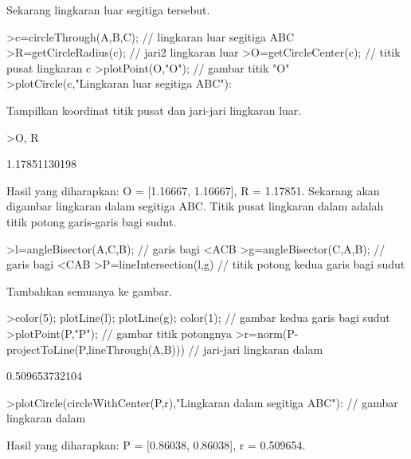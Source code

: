 \documentclass[a4paper,10pt]{article}
\begin{document}
\begin{eulernotebook}
\begin{eulercomment}
\begin{eulercomment}
\begin{eulercomment}
\begin{eulercomment}
\begin{eulercomment}
Sekarang lingkaran luar segitiga tersebut.
\end{eulercomment}
\begin{eulerprompt}
>c=circleThrough(A,B,C); // lingkaran luar segitiga ABC
>R=getCircleRadius(c); // jari2 lingkaran luar
>O=getCircleCenter(c); // titik pusat lingkaran c
>plotPoint(O,"O"); // gambar titik "O"
>plotCircle(c,"Lingkaran luar segitiga ABC"):
\end{eulerprompt}
\begin{eulercomment}
Tampilkan koordinat titik pusat dan jari-jari lingkaran luar.
\end{eulercomment}
\begin{eulerprompt}
>O, R
\end{eulerprompt}
\begin{euleroutput}
  [1.16667,  1.16667]
  1.17851130198
\end{euleroutput}
\begin{eulercomment}
Hasil yang diharapkan: O = [1.16667, 1.16667], R = 1.17851.
Sekarang akan digambar lingkaran dalam segitiga ABC. Titik pusat lingkaran dalam adalah
titik potong garis-garis bagi sudut.
\end{eulercomment}
\begin{eulerprompt}
>l=angleBisector(A,C,B); // garis bagi <ACB
>g=angleBisector(C,A,B); // garis bagi <CAB
>P=lineIntersection(l,g) // titik potong kedua garis bagi sudut
\end{eulerprompt}
\begin{euleroutput}
  [0.86038,  0.86038]
\end{euleroutput}
\begin{eulercomment}
Tambahkan semuanya ke gambar.
\end{eulercomment}
\begin{eulerprompt}
>color(5); plotLine(l); plotLine(g); color(1); // gambar kedua garis bagi sudut
>plotPoint(P,"P"); // gambar titik potongnya
>r=norm(P-projectToLine(P,lineThrough(A,B))) // jari-jari lingkaran dalam
\end{eulerprompt}
\begin{euleroutput}
  0.509653732104
\end{euleroutput}
\begin{eulerprompt}
>plotCircle(circleWithCenter(P,r),"Lingkaran dalam segitiga ABC"): // gambar lingkaran dalam
\end{eulerprompt}
\begin{eulercomment}
Hasil yang diharapkan: P = [0.86038, 0.86038], r = 0.509654.


\end{eulercomment}
\end{eulercomment}
\end{eulercomment}
\end{eulercomment}
\end{eulercomment}
\end{eulernotebook}
\end{document}
